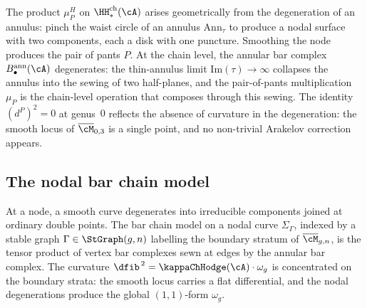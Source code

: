 \begin{remark}%
\label{rem:annulus-pinch-to-pants}%
%
%
The product $\mu_P^H$ on $\HH^{\mathrm{ch}}_*(\cA)$ arises
geometrically from the degeneration of an annulus: pinch the waist
circle of an annulus $\mathrm{Ann}_\tau$ to produce a nodal surface
with two components, each a disk with one puncture. Smoothing the
node produces the pair of pants $P$. At the chain level, the
annular bar complex $B^{\mathrm{ann}}_\bullet(\cA)$ degenerates:
the thin-annulus limit $\mathrm{Im}(\tau)\to\infty$ collapses the
annulus into the sewing of two half-planes, and the pair-of-pants
multiplication $\mu_P$ is the chain-level operation that composes
through this sewing. The identity
$(d^P)^2 = 0$ at genus~$0$ reflects the
absence of curvature in the degeneration: the smooth locus of
$\overline{\cM}_{0,3}$ is a single point, and no non-trivial
Arakelov correction appears.
\end{remark}

\subsection{The nodal bar chain model}
\label{subsec:nodal-bar-chain-model}

At a node, a smooth curve degenerates into irreducible components
joined at ordinary double points. The bar chain model on a nodal
curve $\Sigma_{\Gamma}$, indexed by a stable graph
$\Gamma\in\StGraph(g,n)$ labelling the boundary stratum of
$\overline{\cM}_{g,n}$, is the tensor product of vertex bar
complexes sewn at edges by the annular bar complex. The
curvature $\dfib^{\,2} = \kappaChHodge(\cA)\cdot\omega_g$ is
concentrated on the boundary strata: the smooth locus carries a
flat differential, and the nodal degenerations produce the global
$(1,1)$-form $\omega_g$.


